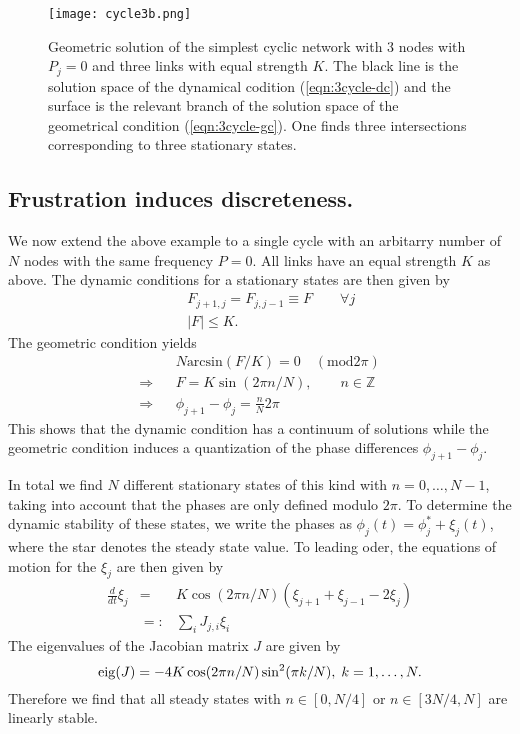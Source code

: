 \documentclass[10pt,aps,pra,twocolumn,superscriptaddress]{revtex4-1}
\newcommand{\be}{\begin{equation}}
\newcommand{\ee}{\end{equation}}
\newcommand{\bea}{\begin{eqnarray}}
\newcommand{\eea}{\end{eqnarray}}
\newcommand{\nn}{\nonumber}
\begin{document}
\begin{figure}[tb]
\centering
\texttt{[image: cycle3b.png]}
\caption{\label{fig:cycle3}
Geometric solution of the simplest cyclic network with
3 nodes with $P_j=0$ and three links with equal
strength $K$.
The black line is the solution space of the dynamical 
codition (\ref{eqn:3cycle-dc}) and the surface is the
relevant branch of the solution space of the geometrical
condition (\ref{eqn:3cycle-gc}). One finds three intersections 
corresponding to three stationary states.
}
\end{figure}

\subsection{Frustration induces discreteness.} 

We now extend the above example to a single cycle with an
arbitarry number of $N$ nodes with  the same frequency 
$P=0$. All links have an equal strength $K$ as above.
The dynamic conditions for a stationary states are then given by
\bea
  && F_{j+1,j} = F_{j,j-1}  \equiv F \qquad \forall j  \\ 
  && |F| \le K.
\eea
 The geometric condition yields
\bea
   && N \mbox{arcsin}(F/K) = 0 \quad (\mbox{mod} 2 \pi) \nn  \\
   \Rightarrow && F = K \sin(2\pi n/N), \qquad  n \in \mathbb{Z}\ \\  
   \Rightarrow && \phi_{j+1} - \phi_j = \frac{n}{N} 2 \pi
\eea
This shows that the dynamic condition has a continuum of 
solutions while the geometric condition induces a 
quantization of the phase differences 
$\phi_{j+1} - \phi_j$. 

In total we find $N$ different stationary states of this kind
with $n = 0,\ldots,N-1$,
taking into account that the phases are only defined modulo
$2\pi$. To determine the dynamic stability of these states,
we write the phases as $\phi_j(t) = \phi_j^* + \xi_j(t)$, where 
the star denotes the steady state value. To leading oder, the 
equations of motion for the $\xi_j$ are then given by 
\bea
   \frac{d}{dt} \xi_j &=& K \cos(2\pi n/N) 
      \left( \xi_{j+1} + \xi_{j-1} - 2 \xi_j \right) \nn \\
     &=:& \sum_i J_{j,i} \xi_i
\eea
The eigenvalues of the Jacobian matrix $J$ are given
by
\be
     {\rm eig}(J) = -4 K \cos(2\pi n/N) \sin^2(\pi k/N),
        \; k = 1,\ldots,N. \nn
\ee
Therefore we find that all steady states with 
$n \in [0,N/4]$ or $n\in[3N/4,N]$ are linearly stable.
 
\end{document}
